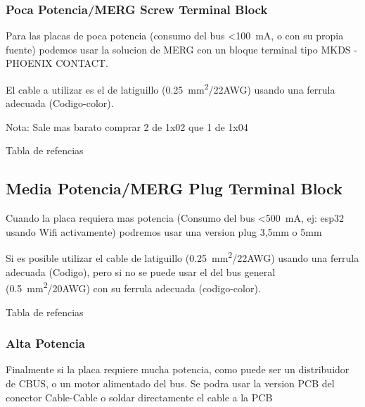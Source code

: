 \subsubsection{Poca Potencia/MERG Screw Terminal Block}
Para las placas de poca potencia (consumo del bus <\SI{100}{\milli\ampere}, o con su propia fuente) podemos usar la solucion de MERG con un bloque terminal tipo MKDS - PHOENIX CONTACT.

El cable a utilizar es el de latiguillo (\SI{0,25}{\milli\metre\squared}/22AWG) usando una ferrula adecuada (Codigo-color). 

\begin{mdframed}
Nota: Sale mas barato comprar 2 de 1x02 que 1 de 1x04 
\end{mdframed}

Tabla de refencias 

\subsection{Media Potencia/MERG Plug Terminal Block}
Cuando la placa requiera mas potencia (Consumo del bus <\SI{500}{\milli\ampere}, ej: esp32 usando Wifi activamente)  podremos usar una version plug 3,5mm o 5mm

Si es posible utilizar el cable de latiguillo (\SI{0,25}{\milli\metre\squared}/22AWG) usando una ferrula adecuada (Codigo), pero si no se puede usar el del bus general
(\SI{0,5}{\milli\metre\squared}/20AWG) con su ferrula adecuada (codigo-color). 

Tabla de refencias 
\subsubsection{Alta Potencia}
Finalmente si la placa requiere mucha potencia, como puede ser un distribuidor de CBUS, o un motor alimentado del bus. Se podra usar la version PCB del conector Cable-Cable o soldar directamente el cable a la PCB

